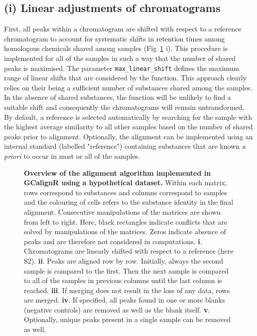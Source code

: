 \documentclass[10pt,letterpaper]{article}
\begin{document}
\subsection*{(i) Linear adjustments of chromatograms}
First, all peaks within a chromatogram are shifted with respect to a reference chromatogram to account for systematic shifts in retention times among homologous chemicals shared among samples (Fig~\ref{Fig:Fig2} i). This procedure is implemented for all of the samples in such a way that the number of shared peaks is maximised. The parameter \texttt{max\_linear\_shift} defines the maximum range of linear shifts that are considered by the function. This approach clearly relies on their being a sufficient number of substances shared among the samples. In the absence of shared substances, the function will be unlikely to find a suitable shift and consequently the chromatograms will remain untransformed. By default, a reference is selected automatically by searching for the sample with the highest average similarity to all other samples based on the number of shared peaks prior to alignment. Optionally, the alignment can be implemented using an internal standard (labelled "reference") containing substances that are known \textit{a priori} to occur in most or all of the samples.

\begin{figure}[htbp]
\centering
\caption{\textbf{Overview of the alignment algorithm implemented in GCalignR using a hypothetical dataset.}
Within each matrix, rows correspond to substances and columns correspond to samples and the colouring of cells refers to the substance identity in the final alignment. Consecutive manipulations of the matrices are shown from left to right. Here, black rectangles indicate conflicts that are solved by manipulations of the matrices. Zeros indicate absence of peaks and are therefore not considered in computations. \textbf{i}. Chromatograms are linearly shifted with respect to a reference (here S2).  \textbf{ii}. Peaks are aligned row by row. Initially, always the second sample is compared to the first. Then the next sample is compared to all of the samples in previous columns until the last column is reached. \textbf{iii}. If merging does not result in the loss of any data, rows are merged. \textbf{iv}. If specified, all peaks found in one or more blanks (negative controls) are removed as well as the blank itself. \textbf{v}. Optionally, unique peaks present in a single sample can be removed as well.}
\label{Fig:Fig2}
\end{figure}
\end{document}
